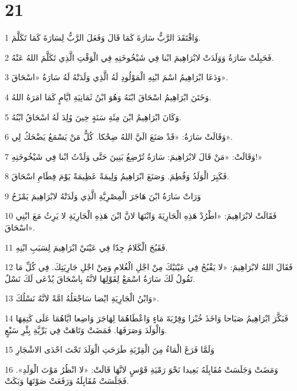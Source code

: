 \chapter{21}

\par 1 وَافْتَقَدَ الرَّبُّ سَارَةَ كَمَا قَالَ وَفَعَلَ الرَّبُّ لِسَارَةَ كَمَا تَكَلَّمَ.
\par 2 فَحَبِلَتْ سَارَةُ وَوَلَدَتْ لابْرَاهِيمَ ابْنا فِي شَيْخُوخَتِهِ فِي الْوَقْتِ الَّذِي تَكَلَّمَ اللهُ عَنْهُ.
\par 3 وَدَعَا ابْرَاهِيمُ اسْمَ ابْنِهِ الْمَوْلُودِ لَهُ الَّذِي وَلَدَتْهُ لَهُ سَارَةُ «اسْحَاقَ».
\par 4 وَخَتَنَ ابْرَاهِيمُ اسْحَاقَ ابْنَهُ وَهُوَ ابْنُ ثَمَانِيَةِ ايَّامٍ كَمَا امَرَهُ اللهُ.
\par 5 وَكَانَ ابْرَاهِيمُ ابْنَ مِئَةِ سَنَةٍ حِينَ وُلِدَ لَهُ اسْحَاقُ ابْنُهُ.
\par 6 وَقَالَتْ سَارَةُ: «قَدْ صَنَعَ الَيَّ اللهُ ضِحْكا. كُلُّ مَنْ يَسْمَعُ يَضْحَكُ لِي».
\par 7 وَقَالَتْ: «مَنْ قَالَ لابْرَاهِيمَ: سَارَةُ تُرْضِعُ بَنِينَ حَتَّى وَلَدْتُ ابْنا فِي شَيْخُوخَتِهِ!»
\par 8 فَكَبِرَ الْوَلَدُ وَفُطِمَ. وَصَنَعَ ابْرَاهِيمُ وَلِيمَةً عَظِيمَةً يَوْمَ فِطَامِ اسْحَاقَ.
\par 9 وَرَاتْ سَارَةُ ابْنَ هَاجَرَ الْمِصْرِيَّةِ الَّذِي وَلَدَتْهُ لابْرَاهِيمَ يَمْزَحُ
\par 10 فَقَالَتْ لابْرَاهِيمَ: «اطْرُدْ هَذِهِ الْجَارِيَةَ وَابْنَهَا لانَّ ابْنَ هَذِهِ الْجَارِيَةِ لا يَرِثُ مَعَ ابْنِي اسْحَاقَ».
\par 11 فَقَبُحَ الْكَلامُ جِدّا فِي عَيْنَيْ ابْرَاهِيمَ لِسَبَبِ ابْنِهِ.
\par 12 فَقَالَ اللهُ لابْرَاهِيمَ: «لا يَقْبُحُ فِي عَيْنَيْكَ مِنْ اجْلِ الْغُلامِ وَمِنْ اجْلِ جَارِيَتِكَ. فِي كُلِّ مَا تَقُولُ لَكَ سَارَةُ اسْمَعْ لِقَوْلِهَا لانَّهُ بِاسْحَاقَ يُدْعَى لَكَ نَسْلٌ.
\par 13 وَابْنُ الْجَارِيَةِ ايْضا سَاجْعَلُهُ امَّةً لانَّهُ نَسْلُكَ».
\par 14 فَبَكَّرَ ابْرَاهِيمُ صَبَاحا وَاخَذَ خُبْزا وَقِرْبَةَ مَاءٍ وَاعْطَاهُمَا لِهَاجَرَ وَاضِعا ايَّاهُمَا عَلَى كَتِفِهَا وَالْوَلَدَ وَصَرَفَهَا. فَمَضَتْ وَتَاهَتْ فِي بَرِّيَّةِ بِئْرِ سَبْعٍ.
\par 15 وَلَمَّا فَرَغَ الْمَاءُ مِنَ الْقِرْبَةِ طَرَحَتِ الْوَلَدَ تَحْتَ احْدَى الاشْجَارِ
\par 16 وَمَضَتْ وَجَلَسَتْ مُقَابِلَهُ بَعِيدا نَحْوَ رَمْيَةِ قَوْسٍ لانَّهَا قَالَتْ: «لا انْظُرُ مَوْتَ الْوَلَدِ». فَجَلَسَتْ مُقَابِلَهُ وَرَفَعَتْ صَوْتَهَا وَبَكَتْ.

